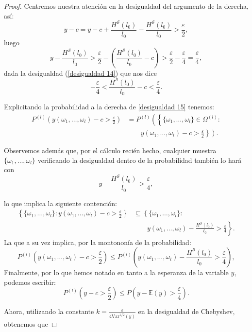 \documentclass{report}
\begin{document}
\begin{proof}
    Centremos nuestra atención en la desigualdad del argumento de la derecha, así:
    \[
    y-c = y-c+\frac{H^{\mathcal{S}}(l_0)}{l_0}-\frac{H^{\mathcal{S}}(l_0)}{l_0} > \frac{\varepsilon}{2},
    \]
    luego
    \[
    y-\frac{H^{\mathcal{S}}(l_0)}{l_0} > \frac{\varepsilon}{2} - \left(\frac{H^{\mathcal{S}}(l_0)}{l_0}-c\right)>\frac{\varepsilon}{2} -\frac{\varepsilon}{4} = \frac{\varepsilon}{4},
    \]
    dada la desigualdad (\ref{desigualdad 14}) que nos dice
    \[
    -\frac{\varepsilon}{4}< \frac{H^{\mathcal{S}}(l_0)}{l_0} - c < \frac{\varepsilon}{4}.
    \]

    Explicitando la probabilidad a la derecha de \ref{desigualdad 15} tenemos:
    \[
    \begin{aligned}
    P^{(l)}\left( y(\omega_1,\ldots,\omega_l) - c > \frac{\varepsilon}{2} \right)
    &= P^{(l)}\left(\left\{\{\omega_1,\ldots,\omega_l\}\in\Omega^{(l)}:\right.\right. \\
    &\qquad \left.\left. y(\omega_1,\ldots,\omega_l) - c > \frac{\varepsilon}{2} \right\}\right).
    \end{aligned}
    \]

    Observemos además que, por el cálculo recién hecho, cualquier muestra $\{\omega_1,\ldots,\omega_l\}$ verificando la desigualdad dentro de la probabilidad también
    lo hará con
    \[
    y-\frac{H^{\mathcal{S}}(l_0)}{l_0} > \frac{\varepsilon}{4},
    \]

    lo que implica la siguiente contención:
    \[
    \begin{aligned}
    \left\{\{\omega_1,\ldots,\omega_l\}: y(\omega_1,\ldots,\omega_l) - c > \frac{\varepsilon}{2} \right\}
    &\subseteq \left\{\{\omega_1,\ldots,\omega_l\}:\right.\\
    &\qquad \left.y(\omega_1,\ldots,\omega_l) - \frac{H^{\mathcal{S}}(l_0)}{l_0} > \frac{\varepsilon}{4} \right\}.
    \end{aligned}
    \]
    La que a su vez implica, por la montononía de la probabilidad:
    \[
    P^{(l)}\left( y(\omega_1,\ldots,\omega_l) - c > \frac{\varepsilon}{2} \right)
    \leq P^{(l)}\left( y(\omega_1,\ldots,\omega_l) - \frac{H^{\mathcal{S}}(l_0)}{l_0} > \frac{\varepsilon}{4} \right),
    \]
    Finalmente, por lo que hemos notado en tanto a la esperanza de la variable $y$, podemos escribir:
    \[
        P^{(l)}\left( y - c > \frac{\varepsilon}{2} \right)
        \leq P\left( y - \mathbb{E}(y) > \frac{\varepsilon}{4} \right).
    \]

    Ahora, utilizando la constante \( k = \frac{\varepsilon}{4\text{Var}^{1/2}(y)} \) en la desigualdad de Chebyshev, obtenemos que


\end{proof}
\end{document}
